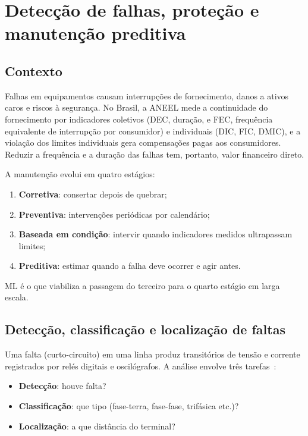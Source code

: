 \documentclass[11pt,a4paper]{article}
\begin{document}
\section{Detecção de falhas, proteção e manutenção preditiva}

\subsection{Contexto}

Falhas em equipamentos causam interrupções de fornecimento, danos a
ativos caros e riscos à segurança. No Brasil, a ANEEL mede a continuidade do
fornecimento por indicadores coletivos (DEC, duração, e FEC, frequência
equivalente de interrupção por consumidor) e individuais (DIC, FIC, DMIC), e
a violação dos limites individuais gera compensações pagas aos consumidores.
Reduzir a frequência e a duração das falhas tem, portanto, valor financeiro
direto.

A manutenção evolui em quatro estágios:
\begin{enumerate}
  \item \textbf{Corretiva}: consertar depois de quebrar;
  \item \textbf{Preventiva}: intervenções periódicas por calendário;
  \item \textbf{Baseada em condição}: intervir quando indicadores medidos
    ultrapassam limites;
  \item \textbf{Preditiva}: estimar quando a falha deve ocorrer e agir antes.
\end{enumerate}
ML é o que viabiliza a passagem do terceiro para o quarto estágio em larga
escala.

\subsection{Detecção, classificação e localização de faltas}

Uma falta (curto-circuito) em uma linha produz transitórios de tensão e
corrente registrados por relés digitais e oscilógrafos. A análise envolve três
tarefas~\cite{faultsurvey}:
\begin{itemize}
  \item \textbf{Detecção}: houve falta?
  \item \textbf{Classificação}: que tipo (fase-terra, fase-fase, trifásica
    etc.)?
  \item \textbf{Localização}: a que distância do terminal?
\end{itemize}
\end{document}

